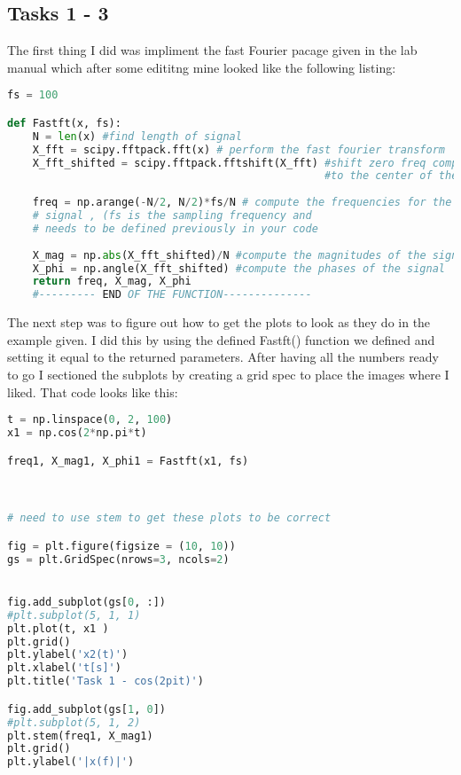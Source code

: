 \documentclass[12pt]{report}
\begin{document}
\subsection{Tasks 1 - 3}
The first thing I did was impliment the fast Fourier pacage given in the lab manual which after some edititng mine looked like the following listing:
\begin{lstlisting}[language=Python]
fs = 100

def Fastft(x, fs):
    N = len(x) #find length of signal
    X_fft = scipy.fftpack.fft(x) # perform the fast fourier transform
    X_fft_shifted = scipy.fftpack.fftshift(X_fft) #shift zero freq components
                                                  #to the center of the spectrum
    
    freq = np.arange(-N/2, N/2)*fs/N # compute the frequencies for the output
    # signal , (fs is the sampling frequency and
    # needs to be defined previously in your code
    
    X_mag = np.abs(X_fft_shifted)/N #compute the magnitudes of the signal
    X_phi = np.angle(X_fft_shifted) #compute the phases of the signal 
    return freq, X_mag, X_phi
    #--------- END OF THE FUNCTION--------------

\end{lstlisting}

The next step was to figure out how to get the plots to look as they do in the example given. I did this by using the defined Fastft() function we defined and setting it equal to the returned parameters. After having all the numbers ready to go I sectioned the subplots by creating a grid spec to place the images where I liked. That code looks like this:

\begin{lstlisting}[language=Python]
t = np.linspace(0, 2, 100)
x1 = np.cos(2*np.pi*t)

freq1, X_mag1, X_phi1 = Fastft(x1, fs)



# need to use stem to get these plots to be correct

fig = plt.figure(figsize = (10, 10))
gs = plt.GridSpec(nrows=3, ncols=2)


fig.add_subplot(gs[0, :])
#plt.subplot(5, 1, 1)
plt.plot(t, x1 )
plt.grid()
plt.ylabel('x2(t)')
plt.xlabel('t[s]')
plt.title('Task 1 - cos(2pit)')

fig.add_subplot(gs[1, 0])
#plt.subplot(5, 1, 2)
plt.stem(freq1, X_mag1)
plt.grid()
plt.ylabel('|x(f)|')

\end{lstlisting}
\end{document}
